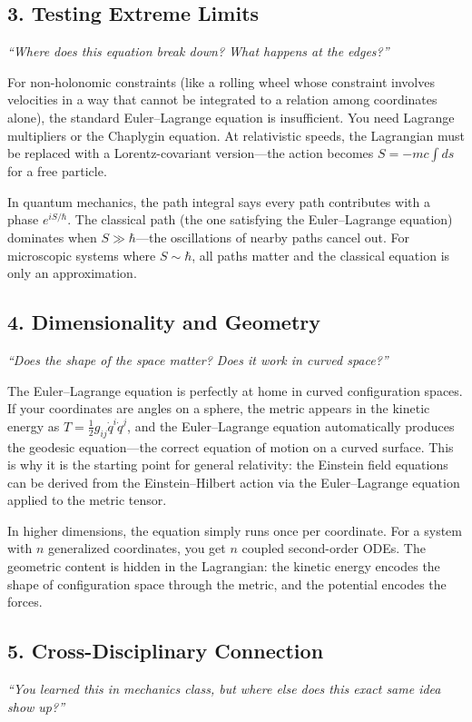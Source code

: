 \documentclass[11pt,openright]{book}
\begin{document}
\subsection*{3. Testing Extreme Limits}
\textit{``Where does this equation break down? What happens at the edges?''}

For non-holonomic constraints (like a rolling wheel whose constraint involves velocities in a way that cannot be integrated to a relation among coordinates alone), the standard Euler--Lagrange equation is insufficient. You need Lagrange multipliers or the Chaplygin equation. At relativistic speeds, the Lagrangian must be replaced with a Lorentz-covariant version---the action becomes $S = -mc \int ds$ for a free particle.

In quantum mechanics, the path integral says every path contributes with a phase $e^{iS/\hbar}$. The classical path (the one satisfying the Euler--Lagrange equation) dominates when $S \gg \hbar$---the oscillations of nearby paths cancel out. For microscopic systems where $S \sim \hbar$, all paths matter and the classical equation is only an approximation.

\subsection*{4. Dimensionality and Geometry}
\textit{``Does the shape of the space matter? Does it work in curved space?''}

The Euler--Lagrange equation is perfectly at home in curved configuration spaces. If your coordinates are angles on a sphere, the metric appears in the kinetic energy as $T = \frac{1}{2}g_{ij}\dot{q}^i\dot{q}^j$, and the Euler--Lagrange equation automatically produces the geodesic equation---the correct equation of motion on a curved surface. This is why it is the starting point for general relativity: the Einstein field equations can be derived from the Einstein--Hilbert action via the Euler--Lagrange equation applied to the metric tensor.

In higher dimensions, the equation simply runs once per coordinate. For a system with $n$ generalized coordinates, you get $n$ coupled second-order ODEs. The geometric content is hidden in the Lagrangian: the kinetic energy encodes the shape of configuration space through the metric, and the potential encodes the forces.

\subsection*{5. Cross-Disciplinary Connection}
\textit{``You learned this in mechanics class, but where else does this exact same idea show up?''}
\end{document}
